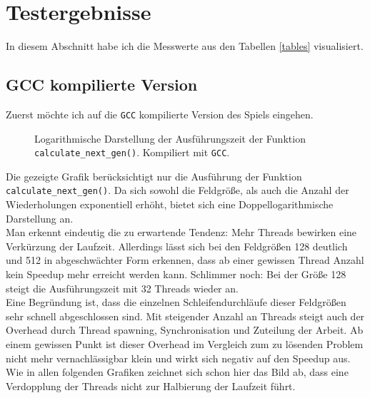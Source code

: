 \documentclass[german,plainarticle,hyperref,utf8]{zihpub}
\begin{document}
	\section{Testergebnisse}
	In diesem Abschnitt habe ich die Messwerte aus den Tabellen \ref{tables} visualisiert.
	\subsection{GCC kompilierte Version}
	Zuerst möchte ich auf die \texttt{GCC} kompilierte Version des Spiels eingehen.\\
	
	\begin{figure}[h]
		\begin{center}
			
		\end{center}
		\caption{Logarithmische Darstellung der Ausführungszeit der Funktion \texttt{calculate\_next\_gen()}. Kompiliert mit \texttt{GCC}.}
	\end{figure}
	Die gezeigte Grafik berücksichtigt nur die Ausführung der Funktion \texttt{calculate\_next\_gen()}. Da sich sowohl die Feldgröße, als auch die Anzahl der Wiederholungen exponentiell erhöht, bietet sich eine Doppellogarithmische Darstellung an.\\
	Man erkennt eindeutig die zu erwartende Tendenz: Mehr Threads bewirken eine Verkürzung der Laufzeit. Allerdings lässt sich bei den Feldgrößen 128 deutlich und 512 in abgeschwächter Form erkennen, dass ab einer gewissen Thread Anzahl kein Speedup mehr erreicht werden kann. Schlimmer noch: Bei der Größe 128 steigt die Ausführungszeit mit 32 Threads wieder an.\\
	Eine Begründung ist, dass die einzelnen Schleifendurchläufe dieser Feldgrößen sehr schnell abgeschlossen sind. Mit steigender Anzahl an Threads steigt auch der Overhead durch Thread spawning, Synchronisation und Zuteilung der Arbeit. Ab einem gewissen Punkt ist dieser Overhead im Vergleich zum zu lösenden Problem nicht mehr vernachlässigbar klein und wirkt sich negativ auf den Speedup aus.\\
	Wie in allen folgenden Grafiken zeichnet sich schon hier das Bild ab, dass eine Verdopplung der Threads nicht zur Halbierung der Laufzeit führt.\\
	
\end{document}
